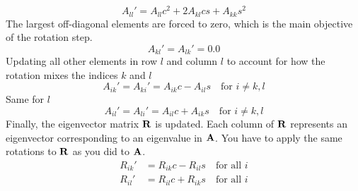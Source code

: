\documentclass[english,notitlepage]{revtex4-1}  %
\begin{document}
$$
A_{ll}' = A_{ll}c^2 + 2A_{kl}cs + A_{kk}s^2
$$
The largest off-diagonal elements are forced to zero, which is the main objective of the rotation step.
$$
A_{kl}' = A_{lk}' = 0.0
$$
Updating all other elements in row $l$ and column $l$ to account for how the rotation mixes the indices $k$ and $l$ 
$$
A_{ik}' = A_{ki}' = A_{ik}c - A_{il}s \quad \text{for } i \neq k,l
$$
Same for $l$
$$
A_{il}' = A_{li}' = A_{il}c + A_{ik}s \quad \text{for } i \neq k,l
$$
Finally, the eigenvector matrix $\bold{R}$ is updated. Each column of $\bold{R}$ represents an eigenvector corresponding to an eigenvalue in $\bold{A}$. You have to apply the same rotations to $\bold{R}$ as you did to $\bold{A}$.
\begin{align*}
R_{ik}' &= R_{ik}c - R_{il}s \quad \text{for all } i \\
R_{il}' &= R_{il}c + R_{ik}s \quad \text{for all } i
\end{align*}
\end{document}
